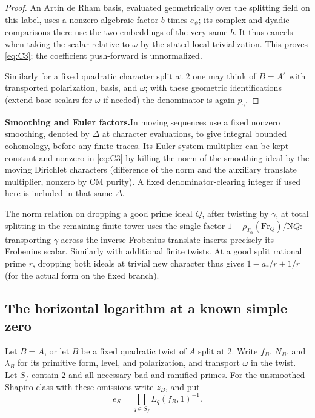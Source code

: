 \begin{proof}
An Artin de Rham basis, evaluated geometrically over the splitting field on this label, uses a
nonzero algebraic factor \(b\) times \(e_\psi\); its complex and dyadic comparisons there use
the two embeddings of the very same \(b\). It thus cancels when taking the scalar relative to
\(\omega\) by the stated local trivialization. This proves \eqref{eq:C3}; the coefficient
push-forward is unnormalized.

Similarly for a fixed quadratic character split at 2 one may think of \(B=A^\varepsilon\) with
transported polarization, basis, and \(\omega\); with these geometric identifications (extend
base scalars for \(\omega\) if needed) the denominator is again \(p_\gamma\).
\end{proof} 

\par\smallskip\noindent\textbf{Smoothing and Euler factors.}\enspace In moving sequences use a fixed nonzero smoothing,
denoted by \(\Delta\) at character evaluations, to give integral bounded cohomology, before
any finite traces. Its Euler-system multiplier can be kept constant and nonzero in
\eqref{eq:C3} by killing the norm of the smoothing ideal by the moving Dirichlet characters
(difference of the norm and the auxiliary translate multiplier, nonzero by CM purity). A fixed
denominator-clearing integer if used here is included in that same \(\Delta\).

The norm relation on dropping a good prime ideal \(Q\), after twisting by \(\gamma\), at total
splitting in the remaining finite tower uses the single factor
\(1-\rho_{T_\alpha}(\mathrm{Fr}_Q)/\mathrm NQ\): transporting \(\gamma\) across the
inverse-Frobenius translate inserts precisely its Frobenius scalar. Similarly with additional
finite twists. At a good split rational prime \(r\), dropping both ideals at trivial new
character thus gives \(1-a_r/r+1/r\) (for the actual form on the fixed branch).


\subsection{The horizontal logarithm at a known simple zero}

Let \(B=A\), or let \(B\) be a fixed quadratic twist of \(A\) split
at \(2\). Write \(f_B\), \(N_B\), and \(\lambda_B\) for its primitive
form, level, and polarization, and transport \(\omega\) in the twist.
Let \(S_f\) contain \(2\) and all necessary bad and ramified primes.
For the unsmoothed Shapiro class with these omissions write \(z_B\), and put
\[
 e_S=\prod_{q\in S_f}L_q(f_B,1)^{-1}.
\]

